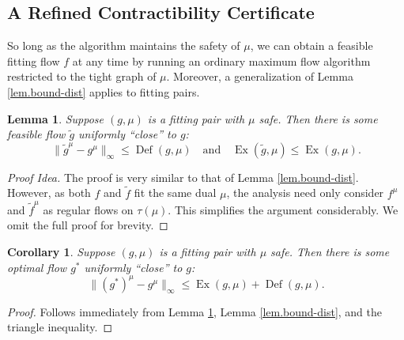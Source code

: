\documentclass[11pt]{article}
\newtheorem{corollary}{Corollary}[theorem]
\newtheorem{lemma}[theorem]{Lemma}
\theoremstyle{definition}
\theoremstyle{definition}
\theoremstyle{definition}
\newcommand{\fu}{f^{\mu}}
\newcommand{\nfiu}{\nabla \fu_i}
\newcommand{\biu}{b_{i}^{\mu}}
\newcommand{\din}{\delta^{\text{in}}}
\newcommand{\dout}{\delta^{\text{out}}}
\DeclareMathOperator{\Ex}{Ex}
\DeclareMathOperator{\Def}{Def}
\begin{document}
    
    \subsection{A Refined Contractibility Certificate}\label{sec:contract-cert}
    So long as the algorithm maintains the safety of $\mu$,
    we can obtain a feasible fitting flow $f$ at any time
    by running an ordinary maximum flow algorithm restricted to the tight graph of $\mu$.
    Moreover, a generalization of Lemma \ref{lem.bound-dist} applies to fitting
    pairs.
    \begin{lemma} \label{lem.bound-dist1.5}
    Suppose $(g, \mu)$ is a fitting pair with $\mu$ safe. Then there is some feasible flow $\tilde{g}$
    uniformly ``close'' to $g$:
    \[ \|\tilde{g}^\mu - g^\mu\|_\infty \leq \Def(g, \mu) \quad \text{and} \quad
       \Ex(\tilde{g}, \mu) \leq \Ex(g, \mu). \]
    \end{lemma}
    \begin{proof}[Proof Idea]
    The proof is very similar to that of Lemma \ref{lem.bound-dist}. However, as both $f$ and
    $\tilde{f}$ fit the same dual $\mu$, the analysis need only consider $f^\mu$ and $\tilde{f}^\mu$
    as regular flows on $\tau(\mu)$. This simplifies the argument considerably. We omit the full proof
    for brevity.
    \end{proof}
    \begin{corollary} \label{lem.bound-dist2}
    Suppose $(g, \mu)$ is a fitting pair with $\mu$ safe. Then there is some optimal flow $g^*$
    uniformly ``close'' to $g$:
    \[ \|(g^*)^\mu - g^\mu\|_\infty \leq \Ex(g, \mu) + \Def(g, \mu). \]
    \end{corollary}
    \begin{proof}
    Follows immediately from Lemma \ref{lem.bound-dist1.5}, Lemma \ref{lem.bound-dist},
    and the triangle inequality.
    \end{proof}
    
\end{document}
